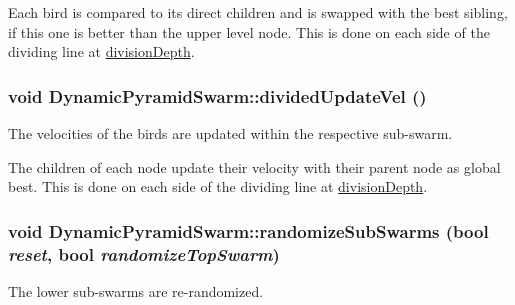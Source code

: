 Each bird is compared to its direct children and is swapped with the best sibling, if this one is better than the upper level node. This is done on each side of the dividing line at \hyperlink{classDynamicPyramidSwarm_1693ca6aad7a16e24a0554c1dfa4e285}{divisionDepth}. \hypertarget{classDynamicPyramidSwarm_64639e24390ed1c07f615c979f1595bf}{
\subsubsection{\setlength{\rightskip}{0pt plus 5cm}void DynamicPyramidSwarm::dividedUpdateVel ()}}
\label{classDynamicPyramidSwarm_64639e24390ed1c07f615c979f1595bf}


The velocities of the birds are updated within the respective sub-swarm. 

The children of each node update their velocity with their parent node as global best. This is done on each side of the dividing line at \hyperlink{classDynamicPyramidSwarm_1693ca6aad7a16e24a0554c1dfa4e285}{divisionDepth}. \hypertarget{classDynamicPyramidSwarm_82676482de529f96eecaeaead9fc29c2}{
\subsubsection{\setlength{\rightskip}{0pt plus 5cm}void DynamicPyramidSwarm::randomizeSubSwarms (bool {\em reset}, \/  bool {\em randomizeTopSwarm})}}
\label{classDynamicPyramidSwarm_82676482de529f96eecaeaead9fc29c2}


The lower sub-swarms are re-randomized. 

